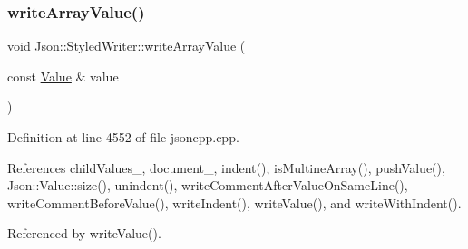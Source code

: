 \subsubsection{\texorpdfstring{write\+Array\+Value()}{writeArrayValue()}}
{\footnotesize\ttfamily void Json\+::\+Styled\+Writer\+::write\+Array\+Value (\begin{DoxyParamCaption}\item[{const \hyperlink{class_json_1_1_value}{Value} \&}]{value }\end{DoxyParamCaption})\hspace{0.3cm}{\ttfamily [private]}}



Definition at line 4552 of file jsoncpp.\+cpp.



References child\+Values\+\_\+, document\+\_\+, indent(), is\+Multine\+Array(), push\+Value(), Json\+::\+Value\+::size(), unindent(), write\+Comment\+After\+Value\+On\+Same\+Line(), write\+Comment\+Before\+Value(), write\+Indent(), write\+Value(), and write\+With\+Indent().



Referenced by write\+Value().


